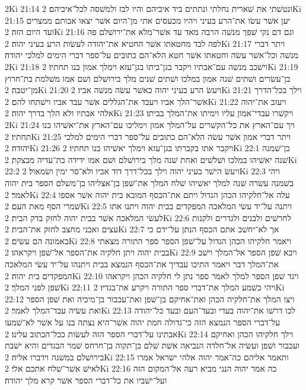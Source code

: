 2Ki 21:14  ונטשׁתי את שׁארית נחלתי ונתתים ביד איביהם והיו לבז ולמשׁסה לכל־איביהם׃
2Ki 21:15  יען אשׁר עשׂו את־הרע בעיני ויהיו מכעסים אתי מן־היום אשׁר יצאו אבותם ממצרים ועד היום הזה׃
2Ki 21:16  וגם דם נקי שׁפך מנשׁה הרבה מאד עד אשׁר־מלא את־ירושׁלם פה לפה לבד מחטאתו אשׁר החטיא את־יהודה לעשׂות הרע בעיני יהוה׃
2Ki 21:17  ויתר דברי מנשׁה וכל־אשׁר עשׂה וחטאתו אשׁר חטא הלא־הם כתובים על־ספר דברי הימים למלכי יהודה׃
2Ki 21:18  וישׁכב מנשׁה עם־אבתיו ויקבר בגן־ביתו בגן־עזא וימלך אמון בנו תחתיו׃
2Ki 21:19  בן־עשׂרים ושׁתים שׁנה אמון במלכו ושׁתים שׁנים מלך בירושׁלם ושׁם אמו משׁלמת בת־חרוץ מן־יטבה׃
2Ki 21:20  ויעשׂ הרע בעיני יהוה כאשׁר עשׂה מנשׁה אביו׃
2Ki 21:21  וילך בכל־הדרך אשׁר־הלך אביו ויעבד את־הגללים אשׁר עבד אביו וישׁתחו להם׃
2Ki 21:22  ויעזב את־יהוה אלהי אבתיו ולא הלך בדרך יהוה׃
2Ki 21:23  ויקשׁרו עבדי־אמון עליו וימיתו את־המלך בביתו׃
2Ki 21:24  ויך עם־הארץ את כל־הקשׁרים על־המלך אמון וימליכו עם־הארץ את־יאשׁיהו בנו תחתיו׃
2Ki 21:25  ויתר דברי אמון אשׁר עשׂה הלא־הם כתובים על־ספר דברי הימים למלכי יהודה׃
2Ki 21:26  ויקבר אתו בקברתו בגן־עזא וימלך יאשׁיהו בנו תחתיו׃
2Ki 22:1  בן־שׁמנה שׁנה יאשׁיהו במלכו ושׁלשׁים ואחת שׁנה מלך בירושׁלם ושׁם אמו ידידה בת־עדיה מבצקת׃
2Ki 22:2  ויעשׂ הישׁר בעיני יהוה וילך בכל־דרך דוד אביו ולא־סר ימין ושׂמאול׃
2Ki 22:3  ויהי בשׁמנה עשׂרה שׁנה למלך יאשׁיהו שׁלח המלך את־שׁפן בן־אצליהו בן־משׁלם הספר בית יהוה לאמר׃
2Ki 22:4  עלה אל־חלקיהו הכהן הגדול ויתם את־הכסף המובא בית יהוה אשׁר אספו שׁמרי הסף מאת העם׃
2Ki 22:5  ויתנה על־יד עשׂי המלאכה המפקדים בבית יהוה ויתנו אתו לעשׂי המלאכה אשׁר בבית יהוה לחזק בדק הבית׃
2Ki 22:6  לחרשׁים ולבנים ולגדרים ולקנות עצים ואבני מחצב לחזק את־הבית׃
2Ki 22:7  אך לא־יחשׁב אתם הכסף הנתן על־ידם כי באמונה הם עשׂים׃
2Ki 22:8  ויאמר חלקיהו הכהן הגדול על־שׁפן הספר ספר התורה מצאתי בבית יהוה ויתן חלקיה את־הספר אל־שׁפן ויקראהו׃
2Ki 22:9  ויבא שׁפן הספר אל־המלך וישׁב את־המלך דבר ויאמר התיכו עבדיך את־הכסף הנמצא בבית ויתנהו על־יד עשׂי המלאכה המפקדים בית יהוה׃
2Ki 22:10  ויגד שׁפן הספר למלך לאמר ספר נתן לי חלקיה הכהן ויקראהו שׁפן לפני המלך׃
2Ki 22:11  ויהי כשׁמע המלך את־דברי ספר התורה ויקרע את־בגדיו׃
2Ki 22:12  ויצו המלך את־חלקיה הכהן ואת־אחיקם בן־שׁפן ואת־עכבור בן־מיכיה ואת שׁפן הספר ואת עשׂיה עבד־המלך לאמר׃
2Ki 22:13  לכו דרשׁו את־יהוה בעדי ובעד־העם ובעד כל־יהודה על־דברי הספר הנמצא הזה כי־גדולה חמת יהוה אשׁר־היא נצתה בנו על אשׁר לא־שׁמעו אבתינו על־דברי הספר הזה לעשׂות ככל־הכתוב עלינו׃
2Ki 22:14  וילך חלקיהו הכהן ואחיקם ועכבור ושׁפן ועשׂיה אל־חלדה הנביאה אשׁת שׁלם בן־תקוה בן־חרחס שׁמר הבגדים והיא ישׁבת בירושׁלם במשׁנה וידברו אליה׃
2Ki 22:15  ותאמר אליהם כה־אמר יהוה אלהי ישׂראל אמרו לאישׁ אשׁר־שׁלח אתכם אלי׃
2Ki 22:16  כה אמר יהוה הנני מביא רעה אל־המקום הזה ועל־ישׁביו את כל־דברי הספר אשׁר קרא מלך יהודה׃
